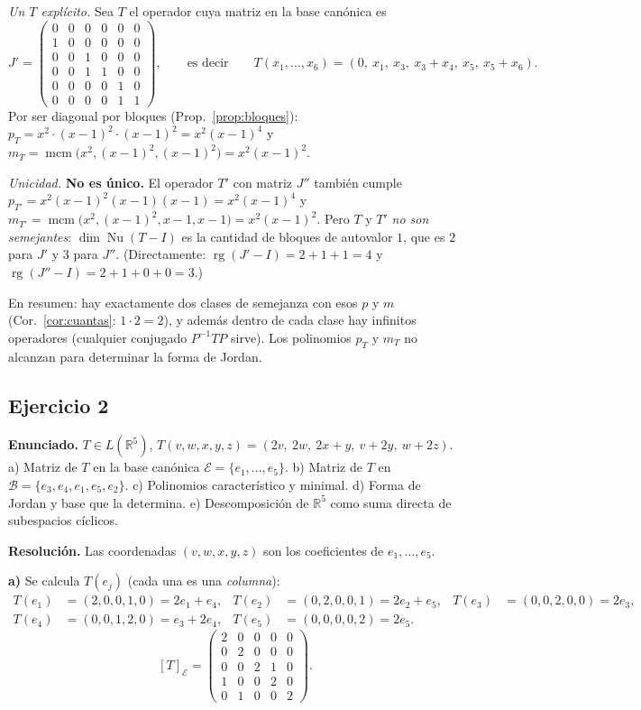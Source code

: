 \documentclass{article}
\newcommand{\R}{\mathbb{R}}
\DeclareMathOperator{\rg}{rg}
\DeclareMathOperator{\Nu}{Nu}
\DeclareMathOperator{\mcm}{mcm}
\theoremstyle{plain}
\theoremstyle{definition}
\theoremstyle{remark}
\begin{document}
\emph{Un \(T\) explícito.} Sea \(T\) el operador cuya matriz en la base canónica es
\[
    J'=\begin{pmatrix}
        0 & 0 & 0 & 0 & 0 & 0 \\
        1 & 0 & 0 & 0 & 0 & 0 \\
        0 & 0 & 1 & 0 & 0 & 0 \\
        0 & 0 & 1 & 1 & 0 & 0 \\
        0 & 0 & 0 & 0 & 1 & 0 \\
        0 & 0 & 0 & 0 & 1 & 1
    \end{pmatrix},\qquad\text{es decir}\qquad T(x_1,\dots,x_6)=(0,\ x_1,\ x_3,\ x_3+x_4,\ x_5,\ x_5+x_6).
\]
Por ser diagonal por bloques (Prop.~\ref{prop:bloques}): \(p_T=x^2\cdot(x-1)^2\cdot(x-1)^2=x^2(x-1)^4\) y \(m_T=\mcm\big(x^2,(x-1)^2,(x-1)^2\big)=x^2(x-1)^2\). \checkmark

\emph{Unicidad.} \textbf{No es único.} El operador \(T'\) con matriz \(J''\) también cumple \(p_{T'}=x^2(x-1)^2(x-1)(x-1)=x^2(x-1)^4\) y \(m_{T'}=\mcm\big(x^2,(x-1)^2,x-1,x-1\big)=x^2(x-1)^2\). Pero \(T\) y \(T'\) \emph{no son semejantes}: \(\dim\Nu(T-I)\) es la cantidad de bloques de autovalor \(1\), que es \(2\) para \(J'\) y \(3\) para \(J''\). (Directamente: \(\rg(J'-I)=2+1+1=4\) y \(\rg(J''-I)=2+1+0+0=3\).)

En resumen: hay exactamente dos clases de semejanza con esos \(p\) y \(m\) (Cor.~\ref{cor:cuantas}: \(1\cdot2=2\)), y además dentro de cada clase hay infinitos operadores (cualquier conjugado \(P^{-1}TP\) sirve). Los polinomios \(p_T\) y \(m_T\) no alcanzan para determinar la forma de Jordan.

\subsection{Ejercicio 2}
\textbf{Enunciado.} \(T\in L(\R^5)\), \(T(v,w,x,y,z)=(2v,\ 2w,\ 2x+y,\ v+2y,\ w+2z)\).
a) Matriz de \(T\) en la base canónica \(\mathcal E=\{e_1,\dots,e_5\}\). b) Matriz de \(T\) en \(\mathcal B=\{e_3,e_4,e_1,e_5,e_2\}\). c) Polinomios característico y minimal. d) Forma de Jordan y base que la determina. e) Descomposición de \(\R^5\) como suma directa de subespacios cíclicos.

\textbf{Resolución.} Las coordenadas \((v,w,x,y,z)\) son los coeficientes de \(e_1,\dots,e_5\).

\textbf{a)} Se calcula \(T(e_j)\) (cada una es una \emph{columna}):
\begin{align*}
    T(e_1) & =(2,0,0,1,0)=2e_1+e_4, & T(e_2) & =(0,2,0,0,1)=2e_2+e_5, & T(e_3) & =(0,0,2,0,0)=2e_3, \\
    T(e_4) & =(0,0,1,2,0)=e_3+2e_4, & T(e_5) & =(0,0,0,0,2)=2e_5.
\end{align*}
\[
    [T]_{\mathcal E}=\begin{pmatrix}2&0&0&0&0\\0&2&0&0&0\\0&0&2&1&0\\1&0&0&2&0\\0&1&0&0&2\end{pmatrix}.
\]
\end{document}
